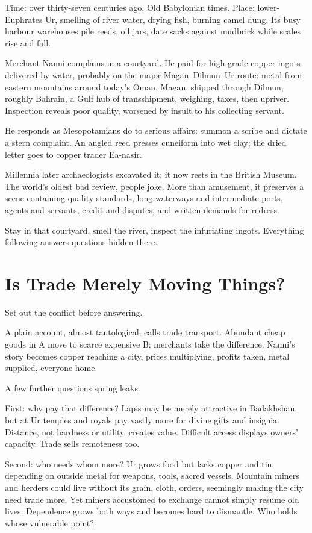 Time: over thirty-seven centuries ago, Old Babylonian times. Place: lower-Euphrates Ur, smelling of river water, drying fish, burning camel dung. Its busy harbour warehouses pile reeds, oil jars, date sacks against mudbrick while scales rise and fall.

Merchant Nanni complains in a courtyard. He paid for high-grade copper ingots delivered by water, probably on the major Magan--Dilmun--Ur route: metal from eastern mountains around today's Oman, Magan, shipped through Dilmun, roughly Bahrain, a Gulf hub of transshipment, weighing, taxes, then upriver. Inspection reveals poor quality, worsened by insult to his collecting servant.

He responds as Mesopotamians do to serious affairs: summon a scribe and dictate a stern complaint. An angled reed presses cuneiform into wet clay; the dried letter goes to copper trader Ea-nasir.

Millennia later archaeologists excavated it; it now rests in the British Museum. The world's oldest bad review, people joke. More than amusement, it preserves a scene containing quality standards, long waterways and intermediate ports, agents and servants, credit and disputes, and written demands for redress.

Stay in that courtyard, smell the river, inspect the infuriating ingots. Everything following answers questions hidden there.

\section{Is Trade Merely Moving Things?}
Set out the conflict before answering.

A plain account, almost tautological, calls trade transport. Abundant cheap goods in A move to scarce expensive B; merchants take the difference. Nanni's story becomes copper reaching a city, prices multiplying, profits taken, metal supplied, everyone home.

A few further questions spring leaks.

First: why pay that difference? Lapis may be merely attractive in Badakhshan, but at Ur temples and royals pay vastly more for divine gifts and insignia. Distance, not hardness or utility, creates value. Difficult access displays owners' capacity. Trade sells remoteness too.

Second: who needs whom more? Ur grows food but lacks copper and tin, depending on outside metal for weapons, tools, sacred vessels. Mountain miners and herders could live without its grain, cloth, orders, seemingly making the city need trade more. Yet miners accustomed to exchange cannot simply resume old lives. Dependence grows both ways and becomes hard to dismantle. Who holds whose vulnerable point?

